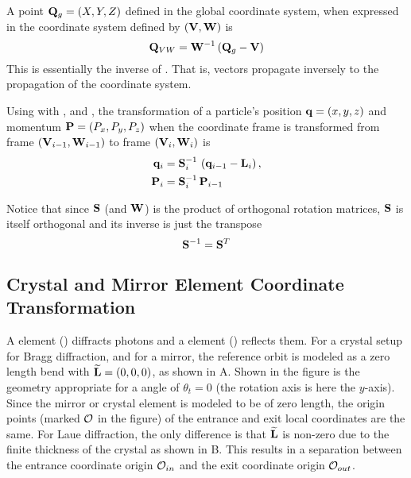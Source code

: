 A point ${\bf Q}_g = (X, Y, Z)$ defined in the global coordinate system, when expressed in the
coordinate system defined by $({\bf V}, {\bf W})$ is
\begin{equation}
  {\bf Q}_{VW} = {\bf W}^{-1} \left( {\bf Q}_g - {\bf V} \right)
  \label{rwrv}
\end{equation}
This is essentially the inverse of . That is, vectors propagate inversely to the
propagation of the coordinate system.

Using  with , and , the transformation of a particle's position ${\bf q} =
(x,y,z)$ and momentum ${\bf P} = (P_x, P_y, P_z)$ when the coordinate frame is transformed from frame
$({\bf V}_{i-1}, {\bf W}_{i-1})$ to frame $({\bf V}_i, {\bf W}_i)$ is
\begin{align}
  {\bf q}_i &= {\bf S}_i^{-1} \, \left( {\bf q}_{i-1} - {\bf L}_i \right), 
    \label{rwlr} \\
  {\bf P}_i &= {\bf S}_i^{-1} \, {\bf P}_{i-1}
    \label{pps}
\end{align}

Notice that since ${\bf S}$ (and ${\bf W}$) is the product of orthogonal rotation matrices, ${\bf S}$ is
itself orthogonal and its inverse is just the transpose
\begin{equation}
  {\bf S}^{-1} = {\bf S}^T
\end{equation}

\subsection{Crystal and Mirror Element Coordinate Transformation}
\label{s:mirror.coords}

A  element () diffracts photons and a  element
() reflects them. For a crystal setup for Bragg diffraction, and for a mirror, the
reference orbit is modeled as a zero length bend with ${\widetilde{\bf L}} = (0, 0, 0)$, as shown in
A. Shown in the figure is the geometry appropriate for a  angle of
$\theta_t = 0$ (the rotation axis is here the $y$-axis). Since the mirror or crystal element is
modeled to be of zero length, the origin points (marked ${\cal O}$ in the figure) of the entrance and
exit local coordinates are the same. For Laue diffraction, the only difference is that ${\widetilde{\bf L}}$
is non-zero due to the finite thickness of the crystal as shown in B. This results in
a separation between the entrance coordinate origin ${\cal O}_{in}$ and the exit coordinate origin
${\cal O}_{out}$.


